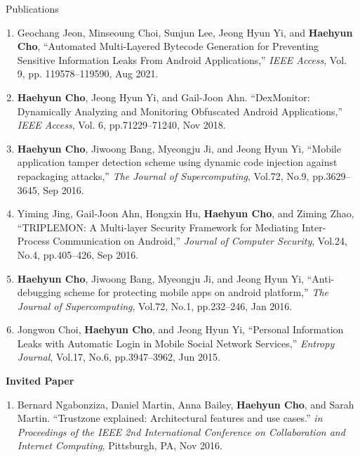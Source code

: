 \documentclass{resume} %
\begin{document}
\begin{rSection}{\faGenderless~Publications}
\begin{enumerate}[leftmargin=0pt]
		\item Geochang Jeon, Minseoung Choi, Sunjun Lee, Jeong Hyun Yi, and \textbf{Haehyun Cho},
		``Automated Multi-Layered Bytecode Generation for Preventing Sensitive Information Leaks From Android Applications,''
		\emph{IEEE Access}, 
		Vol. 9, pp. 119578--119590, Aug 2021.
		
		\item \textbf{Haehyun Cho}, Jeong Hyun Yi, and Gail-Joon Ahn.
        ``DexMonitor: Dynamically Analyzing and Monitoring Obfuscated Android Applications,'' 
        \emph{IEEE Access},
        Vol. 6, pp.71229--71240, Nov 2018.

		\item \textbf{Haehyun Cho}, Jiwoong Bang, Myeongju Ji, and Jeong Hyun Yi, 
		``Mobile application tamper detection scheme using dynamic code injection against repackaging attacks,'' 
		\emph{The Journal of Supercomputing}, 
		Vol.72, No.9, pp.3629--3645, Sep 2016.

		\item Yiming Jing, Gail-Joon Ahn, Hongxin Hu, \textbf{Haehyun Cho}, and Ziming Zhao,
		``TRIPLEMON: A Multi-layer Security Framework for Mediating Inter-Process Communication on Android,'' 
		\emph{Journal of Computer Security}, 
		Vol.24, No.4, pp.405--426, Sep 2016.

		\item \textbf{Haehyun Cho}, Jiwoong Bang, Myeongju Ji, and Jeong Hyun Yi, 
		``Anti-debugging scheme for protecting mobile apps on android platform,'' 
		\emph{The Journal of Supercomputing}, 
		Vol.72, No.1, pp.232--246, Jan 2016.

		\item Jongwon Choi, \textbf{Haehyun Cho}, and Jeong Hyun Yi, 
		``Personal Information Leaks with Automatic Login in Mobile Social Network Services,'' 
		\emph{Entropy Journal}, 
		Vol.17, No.6, pp.3947--3962, Jun 2015.
	\end{enumerate}
    \vspace{3mm}

   
    \strut\textbullet~{\bf Invited Paper}
    \begin{enumerate}[leftmargin=0pt]
        \item Bernard Ngabonziza, Daniel Martin, Anna Bailey, \textbf{Haehyun Cho}, and Sarah Martin.
        ``Trustzone explained: Architectural features and use cases.''
        \emph{in Proceedings of the IEEE 2nd International Conference on Collaboration and Internet Computing}, 
        Pittsburgh, PA, Nov 2016.    
    \end{enumerate}
	\vspace{3mm}



\end{rSection}
\end{document}
